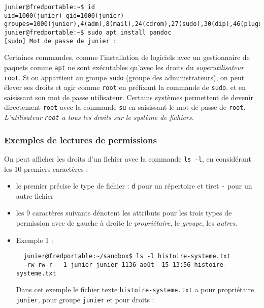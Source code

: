 \documentclass[
  11pt,
]{article}
\newcounter{prop}
\newcounter{logi}
\newcounter{histo}
\begin{document}
\begin{verbatim}
junier@fredportable:~$ id
uid=1000(junier) gid=1000(junier) groupes=1000(junier),4(adm),8(mail),24(cdrom),27(sudo),30(dip),46(plugdev),120(lpadmin),131(lxd),132(sambashare)
junier@fredportable:~$ sudo apt install pandoc
[sudo] Mot de passe de junier :
\end{verbatim}

Certaines commandes, comme l'installation de logiciels avec un
gestionnaire de paquets comme \texttt{apt} ne sont exécutables qu'avec
les droits du \emph{superutilisateur} \texttt{root}. Si on appartient au
groupe \texttt{sudo} (groupe des administrateurs), on peut élever ses
droits et agir comme \texttt{root} en préfixant la commande de
\texttt{sudo}. et en saisissant son mot de passe utilisateur. Certains
systèmes permettent de devenir directement \texttt{root} avec la
commande \texttt{su} en saisissant le mot de passe de \texttt{root}.
\emph{L'utilisateur \texttt{root} a tous les droits sur le système de
fichiers.}

\hypertarget{exemples-de-lectures-de-permissions}{%
\subsubsection{Exemples de lectures de
permissions}\label{exemples-de-lectures-de-permissions}}

On peut afficher les droits d'un fichier avec la commande
\texttt{ls\ -l}, en considérant les 10 premiers caractères :

\begin{itemize}
\item
  le premier précise le type de fichier : \texttt{d} pour un répertoire
  et tiret \texttt{-} pour un autre fichier
\item
  les 9 caractères suivants dénotent les attributs pour les trois types
  de permission avec de gauche à droite le \emph{propriétaire}, le
  \emph{groupe}, les \emph{autres}.
\item
  Exemple 1 :

\begin{verbatim}
  junier@fredportable:~/sandbox$ ls -l histoire-systeme.txt         
  -rw-rw-r-- 1 junier junier 1136 août  15 13:56 histoire-systeme.txt
\end{verbatim}

  Dans cet exemple le fichier texte \texttt{histoire-systeme.txt} a pour
  propriétaire \texttt{junier}, pour groupe \texttt{junier} et pour
  droits :
\end{itemize}
\end{document}
